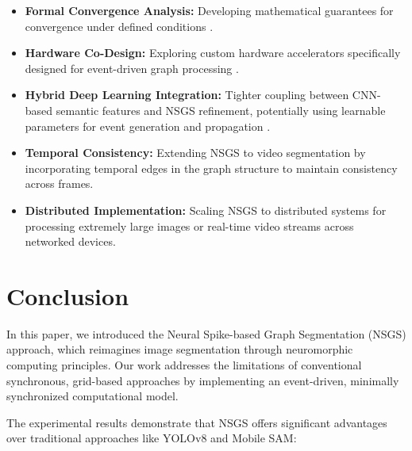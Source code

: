 \documentclass[conference]{IEEEtran}
\begin{document}
\begin{itemize}
    \item \textbf{Formal Convergence Analysis:} Developing mathematical guarantees for convergence under defined conditions \cite{Hochreiter1997}.
    
    \item \textbf{Hardware Co-Design:} Exploring custom hardware accelerators specifically designed for event-driven graph processing \cite{He2016, Fukushima1980, Akopyan2015}.
    
    \item \textbf{Hybrid Deep Learning Integration:} Tighter coupling between CNN-based semantic features and NSGS refinement, potentially using learnable parameters for event generation and propagation \cite{Lin2022, Wang2020}.
    
    \item \textbf{Temporal Consistency:} Extending NSGS to video segmentation by incorporating temporal edges in the graph structure to maintain consistency across frames.
    
    \item \textbf{Distributed Implementation:} Scaling NSGS to distributed systems for processing extremely large images or real-time video streams across networked devices.
\end{itemize}

\section{Conclusion} \label{sec:conclusion}
In this paper, we introduced the Neural Spike-based Graph Segmentation (NSGS) approach, which reimagines image segmentation through neuromorphic computing principles. Our work addresses the limitations of conventional synchronous, grid-based approaches by implementing an event-driven, minimally synchronized computational model.

The experimental results demonstrate that NSGS offers significant advantages over traditional approaches like YOLOv8 and Mobile SAM:
\end{document}
